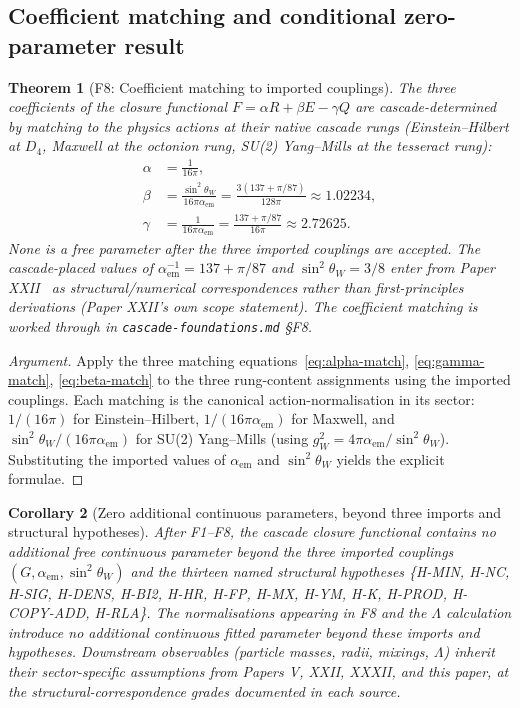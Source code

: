 \documentclass[12pt]{article}
\newtheorem{theorem}{Theorem}
\newtheorem{corollary}[theorem]{Corollary}
\theoremstyle{definition}
\theoremstyle{remark}
\begin{document}
\subsection{Coefficient matching and conditional zero-parameter result}

\begin{theorem}[F8: Coefficient matching to imported couplings]\label{thm:F8}
The three coefficients of the closure functional $F = \alpha R + \beta E - \gamma Q$ are cascade-determined by matching to the physics actions at their native cascade rungs (Einstein--Hilbert at $D_4$, Maxwell at the octonion rung, SU(2) Yang--Mills at the tesseract rung):
\begin{align}
\alpha &= \frac{1}{16 \pi},\\
\beta &= \frac{\sin^2 \theta_W}{16 \pi \alpha_{\mathrm{em}}} = \frac{3(137 + \pi / 87)}{128 \pi} \approx 1.02234,\\
\gamma &= \frac{1}{16 \pi \alpha_{\mathrm{em}}} = \frac{137 + \pi / 87}{16 \pi} \approx 2.72625.
\end{align}
None is a free parameter after the three imported couplings are accepted. The cascade-placed values of $\alpha_{\mathrm{em}}^{-1} = 137 + \pi/87$ and $\sin^2 \theta_W = 3/8$ enter from Paper XXII~\citep{SmartXXII} as \emph{structural/numerical correspondences} rather than first-principles derivations (Paper XXII's own scope statement). The coefficient matching is worked through in \texttt{cascade-foundations.md} \S F8.
\end{theorem}

\begin{proof}[Argument]
Apply the three matching equations~\eqref{eq:alpha-match}, \eqref{eq:gamma-match}, \eqref{eq:beta-match} to the three rung-content assignments using the imported couplings. Each matching is the canonical action-normalisation in its sector: $1/(16\pi)$ for Einstein--Hilbert, $1/(16 \pi \alpha_{\mathrm{em}})$ for Maxwell, and $\sin^2 \theta_W / (16 \pi \alpha_{\mathrm{em}})$ for SU(2) Yang--Mills (using $g_W^2 = 4\pi \alpha_{\mathrm{em}} / \sin^2 \theta_W$). Substituting the imported values of $\alpha_{\mathrm{em}}$ and $\sin^2 \theta_W$ yields the explicit formulae.
\end{proof}

\begin{corollary}[Zero additional continuous parameters, beyond three imports and structural hypotheses]\label{cor:zero-param}
After F1--F8, the cascade closure functional contains no additional free continuous parameter beyond the three imported couplings $(G, \alpha_{\mathrm{em}}, \sin^2\theta_W)$ and the thirteen named structural hypotheses \{H-MIN, H-NC, H-SIG, H-DENS, H-BI2, H-HR, H-FP, H-MX, H-YM, H-K, H-PROD, H-COPY-ADD, H-RLA\}. The normalisations appearing in F8 and the $\Lambda$ calculation introduce no additional continuous fitted parameter beyond these imports and hypotheses. Downstream observables (particle masses, radii, mixings, $\Lambda$) inherit their sector-specific assumptions from Papers V, XXII, XXXII, and this paper, at the structural-correspondence grades documented in each source.
\end{corollary}
\end{document}
